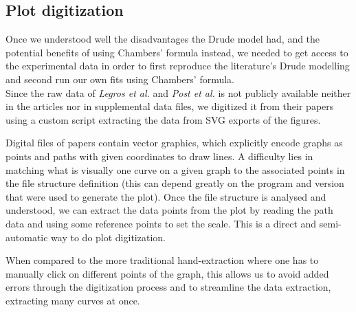 \subsection{Plot digitization}
Once we understood well the disadvantages the Drude model had, 
and the potential benefits of using Chambers' formula instead, 
we needed to get access to the experimental data in order to 
first reproduce the literature's Drude modelling and 
second run our own fits using Chambers' formula.\\

Since the raw data of \textit{Legros et al.} and \textit{Post et al.} is not publicly available neither in the articles nor in supplemental data files, 
we digitized it from their papers using a custom script extracting the data from SVG exports of the figures. 

Digital files of papers contain vector graphics, 
which explicitly encode graphs as points and paths with given coordinates to draw lines. 
A difficulty lies in matching what is visually one curve on a given graph to the associated points in the file structure definition 
(this can depend greatly on the program and version that were used to generate the plot). 
Once the file structure is analysed and understood, 
we can extract the data points from the plot by reading the path data and using some reference points to set the scale.
This is a direct and semi-automatic way to do plot digitization.
 
When compared to the more traditional hand-extraction where one has to manually click on different points of the graph, 
this allows us to avoid added errors through the digitization process 
and to streamline the data extraction, extracting many curves at once.
